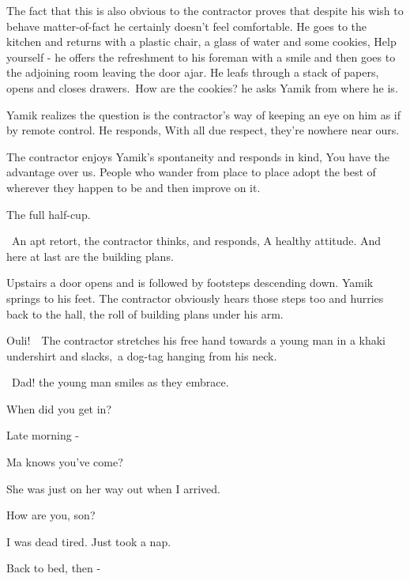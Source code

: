 \documentclass[letterpaper]{article}
\begin{document}
The fact that this is also obvious to the contractor proves that despite his wish to behave matter-of-fact he certainly
doesn't feel comfortable. He goes to the kitchen and returns with a plastic chair, a glass of water and some cookies,
{\textquotedbl}Help yourself - {\textquotedbl} he offers the refreshment to his foreman with a smile and then goes to
the adjoining room leaving the door ajar. He leafs through a stack of papers, opens and closes
drawers.\ {\textquotedbl}How are the cookies?{\textquotedbl} he asks Yamik from where he is. 

Yamik realizes the question is the contractor's way of keeping an eye on him as if by remote control. He responds,
{\textquotedbl}With all due respect, they're nowhere near ours.{\textquotedbl} 

The contractor enjoys Yamik's spontaneity and responds in kind, {\textquotedbl}You have the advantage over us. People
who wander from place to place adopt the best of wherever they happen to be and then improve on it.{\textquotedbl} 

{\textquotedbl}The full half-cup.{\textquotedbl}

~An apt retort, the contractor thinks, and responds, {\textquotedbl}A healthy attitude. And here at last are the
building plans.{\textquotedbl}

Upstairs a door opens and is followed by footsteps descending down. Yamik springs to his feet. The contractor obviously
hears those steps too and hurries back to the hall, the roll of building plans under his arm. 

{\textquotedbl}Ouli!{\textquotedbl}\ \ The contractor stretches his free hand towards a young man in a khaki undershirt
and slacks,\textcolor{red}{\ }a dog-tag hanging from his neck.\ 

~{\textquotedbl}Dad!{\textquotedbl} the young man smiles as they embrace. 

{\textquotedbl}When did you get in?{\textquotedbl} 

{\textquotedbl}Late morning -{\textquotedbl} 

{\textquotedbl}Ma knows you've come?{\textquotedbl} 

{\textquotedbl}She was just on her way out when I arrived.{\textquotedbl} 

{\textquotedbl}How are you, son?{\textquotedbl} 

{\textquotedbl}I was dead tired. Just took a nap.{\textquotedbl} 

{\textquotedbl}Back to bed, then -{\textquotedbl} 
\end{document}
